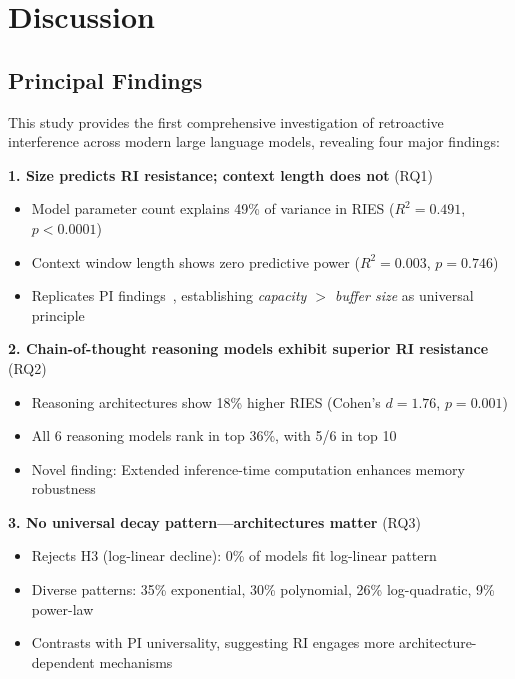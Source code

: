 \documentclass{article}
\begin{document}
\section{Discussion}

\subsection{Principal Findings}

This study provides the first comprehensive investigation of retroactive interference across modern large language models, revealing four major findings:

\textbf{1. Size predicts RI resistance; context length does not} (RQ1)
\begin{itemize}[itemsep=2pt,topsep=3pt,parsep=0pt]
    \item Model parameter count explains 49\% of variance in RIES ($R^2 = 0.491$, $p < 0.0001$)
    \item Context window length shows zero predictive power ($R^2 = 0.003$, $p = 0.746$)
    \item Replicates PI findings~\citep{liu2024unable}, establishing \textit{capacity $>$ buffer size} as universal principle
\end{itemize}

\textbf{2. Chain-of-thought reasoning models exhibit superior RI resistance} (RQ2)
\begin{itemize}[itemsep=2pt,topsep=3pt,parsep=0pt]
    \item Reasoning architectures show 18\% higher RIES (Cohen's $d = 1.76$, $p = 0.001$)
    \item All 6 reasoning models rank in top 36\%, with 5/6 in top 10
    \item Novel finding: Extended inference-time computation enhances memory robustness
\end{itemize}

\textbf{3. No universal decay pattern---architectures matter} (RQ3)
\begin{itemize}[itemsep=2pt,topsep=3pt,parsep=0pt]
    \item Rejects H3 (log-linear decline): 0\% of models fit log-linear pattern
    \item Diverse patterns: 35\% exponential, 30\% polynomial, 26\% log-quadratic, 9\% power-law
    \item Contrasts with PI universality, suggesting RI engages more architecture-dependent mechanisms
\end{itemize}
\end{document}
